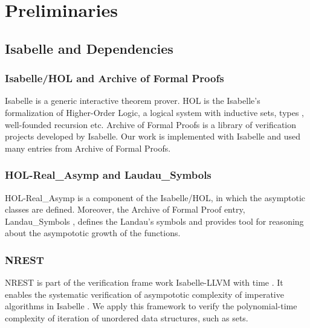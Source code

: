 \newcommand{\red}{\leq_p}
\newcommand{\problem}[3]{
\begin{definition}
    {#1} \\
    \textbf{Input}: {#2}\\
    \textbf{Output}: {#3}
\end{definition}
}
\newcommand{\bigO}[1]{\mathcal{O}({#1})}

\chapter{Preliminaries}\label{chapter:preliminaries}
\section{Isabelle and Dependencies}
\subsection*{Isabelle/HOL and Archive of Formal Proofs}
Isabelle \cite{wenzel2004isabelle} is a generic interactive theorem prover. HOL is the Isabelle's formalization of Higher-Order Logic, 
a logical system with inductive sets, types , well-founded recursion etc. 
Archive of Formal Proofs \cite{AFP} is a library of verification projects developed by Isabelle. 
Our work is implemented with Isabelle and used many entries from Archive of Formal 
Proofs.

\subsection*{HOL-Real\_Asymp and Laudau\_Symbols}
HOL-Real\_Asymp is a component of the Isabelle/HOL, in which the asymptotic 
classes are defined. Moreover, the Archive of Formal Proof entry, Landau\_Symbols \cite{Landau_Symbols-AFP}, 
defines the Landau's symbols and provides tool for reasoning about the asympototic
growth of the functions. 

\subsection*{NREST}
NREST is part of the verification frame work Isabelle-LLVM with time \cite{haslbeck2021verified}. It enables 
the systematic verification of asympototic complexity of imperative algorithms in Isabelle \cite{zhan2018verifying}. 
We apply this framework 
to verify the polynomial-time complexity of iteration of unordered data structures, such as sets.

